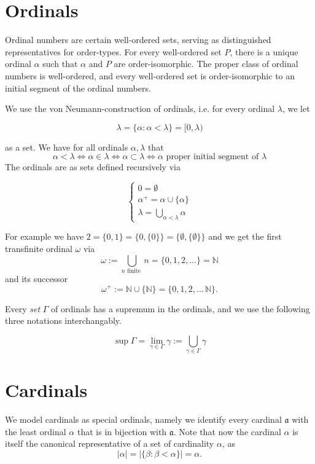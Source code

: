 \section{Ordinals}
Ordinal numbers are certain well-ordered sets, serving as distinguished representatives for order-types. For every well-ordered set $P$, there is a unique ordinal $\alpha$ such that $\alpha$ and $P$ are order-isomorphic. The proper class of ordinal numbers is well-ordered, and every well-ordered set is order-isomorphic to an initial segment of the ordinal numbers.

We use the von Neumann-construction of ordinals, i.e. for every ordinal $\lambda$, we let

\[ \lambda = \{ \alpha : \alpha < \lambda \} = [0,\lambda) \]

as a set. We have for all ordinals $\alpha,\lambda$ that
\[ \alpha < \lambda \Leftrightarrow \alpha \in \lambda \Leftrightarrow \alpha \subset \lambda \Leftrightarrow \alpha \text{ proper initial segment of } \lambda \]
The ordinals are as sets defined recursively via

\[ 
\begin{cases}
	0 = \emptyset \\
	\alpha^+ = \alpha \cup \{\alpha\} \\
	\lambda = \bigcup_{\alpha < \lambda} \alpha
\end{cases}
\]

For example we have $2 = \{0,1\} = \{0,\{0\}\} = \{\emptyset, \{\emptyset\}\}$ and we get the first transfinite ordinal $\omega$ via
\[ \omega := \bigcup_{n \text{ finite }} n = \{0,1,2,\ldots\} = \mathbb N \]
and its successor
\[ \omega^+ := \mathbb N \cup \{ \mathbb N \} = \{0,1,2,\ldots\, \mathbb N \}. \]

Every \emph{set} $\Gamma$ of ordinals has a supremum in the ordinals, and we use the following three notations interchangably.

\[ \sup \Gamma = \lim_{\gamma \in \Gamma} \gamma := \bigcup_{\gamma \in \Gamma} \gamma \]

\section{Cardinals}
We model cardinals as special ordinals, namely we identify every cardinal $\mathfrak a$ with the least ordinal $\alpha$ that is in bijection with $\mathfrak a$. Note that now the cardinal $\alpha$ is itself the canonical representative of a set of cardinality $\alpha$, as
\[ |\alpha| = |\{ \beta : \beta < \alpha \}| = \alpha. \]

